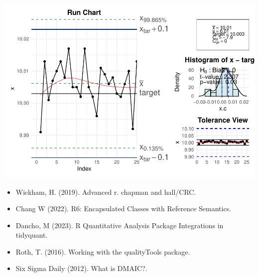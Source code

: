 \documentclass[
]{book}
\providecommand{\tightlist}{%
  \setlength{\itemsep}{0pt}\setlength{\parskip}{0pt}}
\begin{document}
\includegraphics{Libro_TidyQualityTools_files/figure-latex/unnamed-chunk-154-1.pdf}

\begin{itemize}
\tightlist
\item
  Wickham, H. (2019). Advanced r. chapman and hall/CRC.
\item
  Chang W (2022). R6: Encapsulated Classes with Reference Semantics.
\item
  Dancho, M (2023). R Quantitative Analysis Package Integrations in tidyquant.
\item
  Roth, T. (2016). Working with the qualityTools package.
\item
  Six Sigma Daily (2012). What is DMAIC?.
\end{itemize}

  
\end{document}
